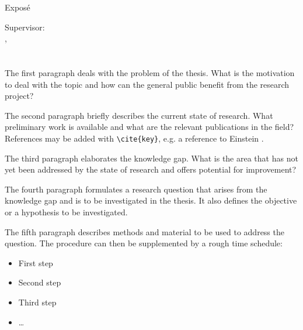 \documentclass[12pt,a4paper,oneside]{book}
\author{\Author}
\title{\EnglishTitle}
\begin{document}
	\pagestyle{title}
	\vspace*{4cm}
	\begin{center}
		{\huge Exposé}
		\vspace{2cm}
		
		{\Large \EnglishTitle}
		\vspace{2cm}
		
		{\large \Author}
		\vspace{2cm}
		
		\vfill
		
	\end{center}
	Supervisor: \Supervisor\\
	\City, \SubmissionMonth \\
	
	\newpage
	\pagestyle{empty}
	\section*{\EnglishTitle}
    {\color{orange}
    	The first paragraph deals with the problem of the thesis. What is the motivation to deal with the topic and how can the general public benefit from the research project? 
    	
    	The second paragraph briefly describes the current state of research. What preliminary work is available and what are the relevant publications in the field? References may be added with \verb|\cite{key}|, e.g. a reference to Einstein \cite{Einstein1905}.
    	
    	The third paragraph elaborates the knowledge gap. What is the area that has not yet been addressed by the state of research and offers potential for improvement?
    	
    	The fourth paragraph formulates a research question that arises from the knowledge gap and is to be investigated in the thesis. It also defines the objective or a hypothesis to be investigated.
    	
    	The fifth paragraph describes methods and material to be used to address the question. The procedure can then be supplemented by a rough time schedule:
    	
    	\begin{itemize}
    		\item First step
    		\item Second step
    		\item Third step 
            \item \dots
    	\end{itemize}
     }
	
	\newpage
    \printbibliography[title={Bibliography}]
\end{document}
